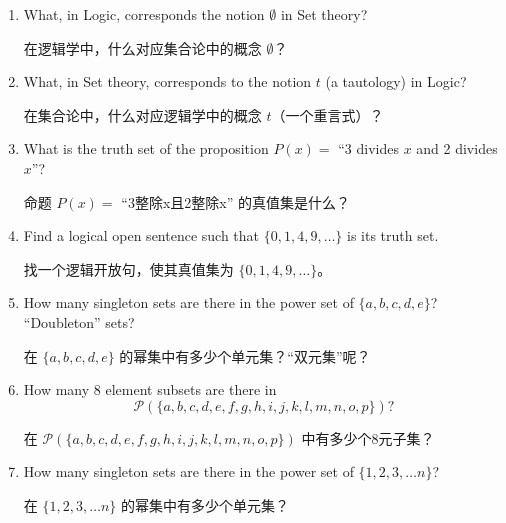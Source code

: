 \begin{enumerate}
  \item What, in Logic, corresponds the notion $\emptyset$ in Set theory?
  
  在逻辑学中，什么对应集合论中的概念 $\emptyset$？
  \wbvfill
  
  \item What, in Set theory, corresponds to the notion $t$ (a tautology) in Logic?
  
  在集合论中，什么对应逻辑学中的概念 $t$（一个重言式）？
  \wbvfill
  
  \item What is the truth set of the proposition $P(x) = $ ``3 divides $x$ and 2 divides $x$''?
  
  命题 $P(x) = $ “3整除x且2整除x” 的真值集是什么？
  \wbvfill
  
  \workbookpagebreak
  
  \item Find a logical open sentence such that $\{0, 1, 4, 9, \ldots \}$ is
  its truth set.
  
  找一个逻辑开放句，使其真值集为 $\{0, 1, 4, 9, \ldots \}$。
  \wbvfill
  
  
  \item How many singleton sets are there in the power set of 
  $\{a,b,c,d,e\}$?
  ``Doubleton'' sets?
  
  在 $\{a,b,c,d,e\}$ 的幂集中有多少个单元集？“双元集”呢？
  
  \wbvfill
  
  \item How many 8 element subsets are there in
  \[ {\mathcal P}(\{a,b,c,d,e,f,g,h,i,j,k,l,m,n,o,p\})?
  \]
  
  在 ${\mathcal P}(\{a,b,c,d,e,f,g,h,i,j,k,l,m,n,o,p\})$ 中有多少个8元子集？
  
  \wbvfill
  
  \item How many singleton sets are there in the power set of 
  $\{1,2,3, \ldots n\}$?
  
  在 $\{1,2,3, \ldots n\}$ 的幂集中有多少个单元集？
  \wbvfill
  
  \workbookpagebreak
  
  \end{enumerate}
  
  
  
